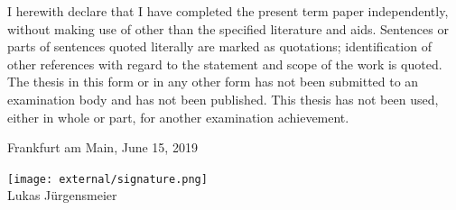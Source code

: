 \documentclass[12pt,a4paper]{article}
\begin{document}
I herewith declare that I have completed the present term paper independently, without making use of
other than the specified literature and aids. Sentences or parts of sentences quoted literally are
marked as quotations; identification of other references with regard to the statement and scope of
the work is quoted. The thesis in this form or in any other form has not been submitted to an examination body and has not been published.
This thesis has not been used, either in whole or part, for another examination achievement.

\vspace{1cm}

Frankfurt am Main, June 15, 2019

\texttt{[image: external/signature.png]}\\
Lukas J\"urgensmeier
\end{document}

